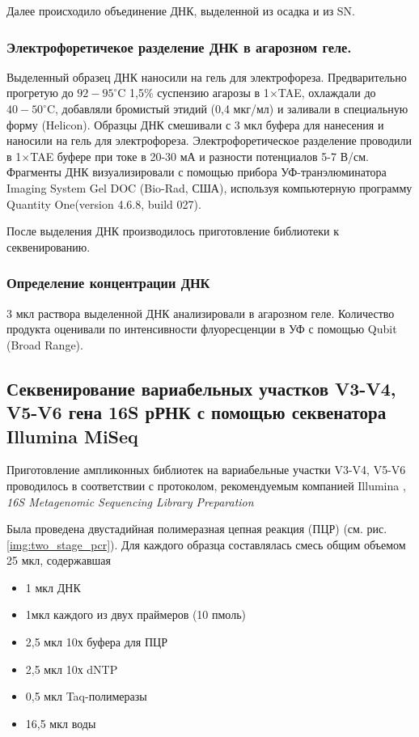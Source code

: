 Далее происходило объединение ДНК, выделенной из осадка и из SN. 

\subsubsection{ Электрофоретичекое разделение ДНК в агарозном геле.} 

Выделенный образец ДНК наносили на гель для электрофореза. Предварительно прогретую до $92-95^{\circ}$C 1,5\% суспензию агарозы в 1$\times$TAE, охлаждали до  $40-50^{\circ}$C, добавляли бромистый этидий (0,4 мкг/мл) и заливали в специальную форму (Helicon). Образцы ДНК  смешивали с 3 мкл буфера для нанесения и наносили на гель для электрофореза. Электрофоретическое разделение проводили в 1$\times$TAE буфере при токе в 20-30 мА и разности потенциалов 5-7 В/см. Фрагменты ДНК визуализировали с помощью прибора УФ-транэлюминатора Imaging System Gel DOC (Bio-Rad, США), используя компьютерную программу Quantity One(version 4.6.8, build 027). 

После выделения ДНК производилось приготовление библиотеки к секвенированию.

\subsubsection{Определение концентрации ДНК}

3 мкл раствора выделенной ДНК анализировали в агарозном геле. Количество продукта оценивали по интенсивности флуоресценции в УФ с помощью Qubit (Broad Range). 

\subsection{Секвенирование вариабельных участков V3-V4, V5-V6 гена 16S рРНК с помощью секвенатора Illumina MiSeq }  \label{subsect1_2_2}

Приготовление ампликонных библиотек на вариабельные участки V3-V4, V5-V6 проводилось  в соответствии с протоколом, рекомендуемым компанией Illumina , \textit{16S Metagenomic Sequencing Library Preparation }

Была проведена  двустадийная полимеразная цепная реакция (ПЦР) (см. рис. \ref{img:two_stage_pcr}). Для каждого образца составлялась смесь общим объемом 25 мкл, содержавшая

\begin{itemize}
\item 1 мкл ДНК
\item 1мкл каждого из двух праймеров (10 пмоль)
\item 2,5 мкл 10х буфера для ПЦР
\item 2,5 мкл 10х dNTP
\item 0,5 мкл  Taq-полимеразы
\item 16,5 мкл воды
\end{itemize}

